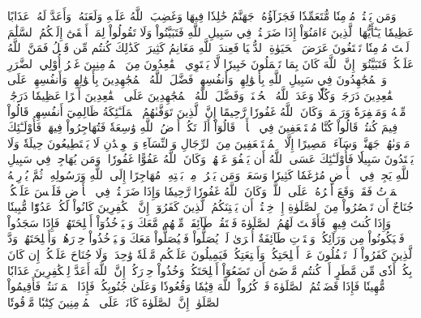 وَمَن يَقۡتُلۡ مُؤۡمِنٗا مُّتَعَمِّدٗا فَجَزَآؤُهُۥ جَهَنَّمُ خَٰلِدٗا فِيهَا وَغَضِبَ ٱللَّهُ عَلَيۡهِ وَلَعَنَهُۥ وَأَعَدَّ لَهُۥ عَذَابًا عَظِيمٗا
يَـٰٓأَيُّهَا ٱلَّذِينَ ءَامَنُوٓاْ إِذَا ضَرَبۡتُمۡ فِي سَبِيلِ ٱللَّهِ فَتَبَيَّنُواْ وَلَا تَقُولُواْ لِمَنۡ أَلۡقَىٰٓ إِلَيۡكُمُ ٱلسَّلَٰمَ لَسۡتَ مُؤۡمِنٗا تَبۡتَغُونَ عَرَضَ ٱلۡحَيَوٰةِ ٱلدُّنۡيَا فَعِندَ ٱللَّهِ مَغَانِمُ كَثِيرَةٞۚ كَذَٰلِكَ كُنتُم مِّن قَبۡلُ فَمَنَّ ٱللَّهُ عَلَيۡكُمۡ فَتَبَيَّنُوٓاْۚ إِنَّ ٱللَّهَ كَانَ بِمَا تَعۡمَلُونَ خَبِيرٗا
لَّا يَسۡتَوِي ٱلۡقَٰعِدُونَ مِنَ ٱلۡمُؤۡمِنِينَ غَيۡرُ أُوْلِي ٱلضَّرَرِ وَٱلۡمُجَٰهِدُونَ فِي سَبِيلِ ٱللَّهِ بِأَمۡوَٰلِهِمۡ وَأَنفُسِهِمۡۚ فَضَّلَ ٱللَّهُ ٱلۡمُجَٰهِدِينَ بِأَمۡوَٰلِهِمۡ وَأَنفُسِهِمۡ عَلَى ٱلۡقَٰعِدِينَ دَرَجَةٗۚ وَكُلّٗا وَعَدَ ٱللَّهُ ٱلۡحُسۡنَىٰۚ وَفَضَّلَ ٱللَّهُ ٱلۡمُجَٰهِدِينَ عَلَى ٱلۡقَٰعِدِينَ أَجۡرًا عَظِيمٗا
دَرَجَٰتٖ مِّنۡهُ وَمَغۡفِرَةٗ وَرَحۡمَةٗۚ وَكَانَ ٱللَّهُ غَفُورٗا رَّحِيمًا
إِنَّ ٱلَّذِينَ تَوَفَّىٰهُمُ ٱلۡمَلَـٰٓئِكَةُ ظَالِمِيٓ أَنفُسِهِمۡ قَالُواْ فِيمَ كُنتُمۡۖ قَالُواْ كُنَّا مُسۡتَضۡعَفِينَ فِي ٱلۡأَرۡضِۚ قَالُوٓاْ أَلَمۡ تَكُنۡ أَرۡضُ ٱللَّهِ وَٰسِعَةٗ فَتُهَاجِرُواْ فِيهَاۚ فَأُوْلَـٰٓئِكَ مَأۡوَىٰهُمۡ جَهَنَّمُۖ وَسَآءَتۡ مَصِيرًا
إِلَّا ٱلۡمُسۡتَضۡعَفِينَ مِنَ ٱلرِّجَالِ وَٱلنِّسَآءِ وَٱلۡوِلۡدَٰنِ لَا يَسۡتَطِيعُونَ حِيلَةٗ وَلَا يَهۡتَدُونَ سَبِيلٗا
فَأُوْلَـٰٓئِكَ عَسَى ٱللَّهُ أَن يَعۡفُوَ عَنۡهُمۡۚ وَكَانَ ٱللَّهُ عَفُوًّا غَفُورٗا
۞وَمَن يُهَاجِرۡ فِي سَبِيلِ ٱللَّهِ يَجِدۡ فِي ٱلۡأَرۡضِ مُرَٰغَمٗا كَثِيرٗا وَسَعَةٗۚ وَمَن يَخۡرُجۡ مِنۢ بَيۡتِهِۦ مُهَاجِرًا إِلَى ٱللَّهِ وَرَسُولِهِۦ ثُمَّ يُدۡرِكۡهُ ٱلۡمَوۡتُ فَقَدۡ وَقَعَ أَجۡرُهُۥ عَلَى ٱللَّهِۗ وَكَانَ ٱللَّهُ غَفُورٗا رَّحِيمٗا
وَإِذَا ضَرَبۡتُمۡ فِي ٱلۡأَرۡضِ فَلَيۡسَ عَلَيۡكُمۡ جُنَاحٌ أَن تَقۡصُرُواْ مِنَ ٱلصَّلَوٰةِ إِنۡ خِفۡتُمۡ أَن يَفۡتِنَكُمُ ٱلَّذِينَ كَفَرُوٓاْۚ إِنَّ ٱلۡكَٰفِرِينَ كَانُواْ لَكُمۡ عَدُوّٗا مُّبِينٗا
وَإِذَا كُنتَ فِيهِمۡ فَأَقَمۡتَ لَهُمُ ٱلصَّلَوٰةَ فَلۡتَقُمۡ طَآئِفَةٞ مِّنۡهُم مَّعَكَ وَلۡيَأۡخُذُوٓاْ أَسۡلِحَتَهُمۡۖ فَإِذَا سَجَدُواْ فَلۡيَكُونُواْ مِن وَرَآئِكُمۡ وَلۡتَأۡتِ طَآئِفَةٌ أُخۡرَىٰ لَمۡ يُصَلُّواْ فَلۡيُصَلُّواْ مَعَكَ وَلۡيَأۡخُذُواْ حِذۡرَهُمۡ وَأَسۡلِحَتَهُمۡۗ وَدَّ ٱلَّذِينَ كَفَرُواْ لَوۡ تَغۡفُلُونَ عَنۡ أَسۡلِحَتِكُمۡ وَأَمۡتِعَتِكُمۡ فَيَمِيلُونَ عَلَيۡكُم مَّيۡلَةٗ وَٰحِدَةٗۚ وَلَا جُنَاحَ عَلَيۡكُمۡ إِن كَانَ بِكُمۡ أَذٗى مِّن مَّطَرٍ أَوۡ كُنتُم مَّرۡضَىٰٓ أَن تَضَعُوٓاْ أَسۡلِحَتَكُمۡۖ وَخُذُواْ حِذۡرَكُمۡۗ إِنَّ ٱللَّهَ أَعَدَّ لِلۡكَٰفِرِينَ عَذَابٗا مُّهِينٗا
فَإِذَا قَضَيۡتُمُ ٱلصَّلَوٰةَ فَٱذۡكُرُواْ ٱللَّهَ قِيَٰمٗا وَقُعُودٗا وَعَلَىٰ جُنُوبِكُمۡۚ فَإِذَا ٱطۡمَأۡنَنتُمۡ فَأَقِيمُواْ ٱلصَّلَوٰةَۚ إِنَّ ٱلصَّلَوٰةَ كَانَتۡ عَلَى ٱلۡمُؤۡمِنِينَ كِتَٰبٗا مَّوۡقُوتٗا
